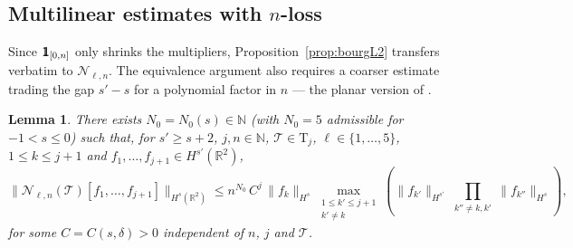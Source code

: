 \documentclass[a4paper,
11pt,  reqno]{amsart}
\newcommand{\mathbbm}[1]{\mathchoice%
    {\hbox{\sffamily 1\kern-.40em 1}}%
    {\hbox{\sffamily 1\kern-.40em 1}}%
    {\hbox{\scriptsize\sffamily 1\kern-.30em 1}}%
    {\hbox{\tiny\sffamily 1\kern-.25em 1}}}%
\newcommand{\5}{\textup{V}}
\newcommand{\ind}{\mathbbm 1}
\newcommand{\dl}{\delta}
\newtheorem{lemma}[theorem]{Lemma}
\theoremstyle{remark}
\newcommand{\R}{\mathbb{R}}
\newcommand{\TT}{\mathcal{T}}
\newcommand{\Tr}{\mathrm{T}}
\renewcommand{\l}{\ell}
\newcommand{\N}{\mathbb{N}}
\numberwithin{equation}{section}
\numberwithin{theorem}{section}
\newcommand{\Ncal}{\mathcal{N}}
\begin{document}
\subsection{Multilinear estimates with \texorpdfstring{$n$}{n}-loss}

Since $\ind_{[0,n]}$ only shrinks the multipliers,
Proposition~\ref{prop:bourgL2} transfers verbatim to $\Ncal_{\l,n}$.
The equivalence argument also requires a coarser estimate trading
the gap $s'-s$ for a polynomial factor in $n$ --- the planar version
of \cite[Lemma~5.2]{chcora}.

\begin{lemma}\label{lem:dens_estimativas}
There exists $N_0=N_0(s)\in\N$ (with $N_0=5$ admissible for
$-1<s\le 0$) such that, for $s'\ge s+2$, $j,n\in\N$, $\TT\in\Tr_j$,
$\l\in\{1,\dots,5\}$, $1\le k\le j+1$ and
$f_1,\dots,f_{j+1}\in H^{s'}(\R^2)$,
\begin{equation}\label{eq:dens_estimativas}
\|\Ncal_{\l,n}(\TT)[f_1,\dots,f_{j+1}]\|_{H^s(\R^2)}
\le n^{N_0}\, C^j\, \|f_k\|_{H^s}
\max_{\substack{1\le k'\le j+1\\ k'\ne k}}\!\left(
\|f_{k'}\|_{H^{s'}}\!\!\!\prod_{\substack{k''\ne k,k'}}\!\!\|f_{k''}\|_{H^s}
\right),
\end{equation}
for some $C=C(s,\dl)>0$ independent of $n$, $j$ and $\TT$.
\end{lemma}
\end{document}
